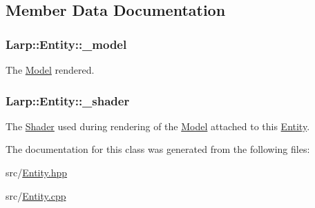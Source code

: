 \subsection{Member Data Documentation}
\hypertarget{classLarp_1_1Entity_afdfe4aa2819f1ba5d0623cd034bec14e}{
\subsubsection[{\-\_\-model}]{ Larp\-::\-Entity\-::\-\_\-model\hspace{0.3cm}{\ttfamily [private]}}}\label{classLarp_1_1Entity_afdfe4aa2819f1ba5d0623cd034bec14e}
The \hyperlink{classLarp_1_1Model}{Model} rendered. \hypertarget{classLarp_1_1Entity_a237a03d104060dcf5db941d8b4bd5a5a}{
\subsubsection[{\-\_\-shader}]{ Larp\-::\-Entity\-::\-\_\-shader\hspace{0.3cm}{\ttfamily [private]}}}\label{classLarp_1_1Entity_a237a03d104060dcf5db941d8b4bd5a5a}
The \hyperlink{classLarp_1_1Shader}{Shader} used during rendering of the \hyperlink{classLarp_1_1Model}{Model} attached to this \hyperlink{classLarp_1_1Entity}{Entity}. 

The documentation for this class was generated from the following files\-:\begin{DoxyCompactItemize}
\item 
src/\hyperlink{Entity_8hpp}{Entity.\-hpp}\item 
src/\hyperlink{Entity_8cpp}{Entity.\-cpp}\end{DoxyCompactItemize}

